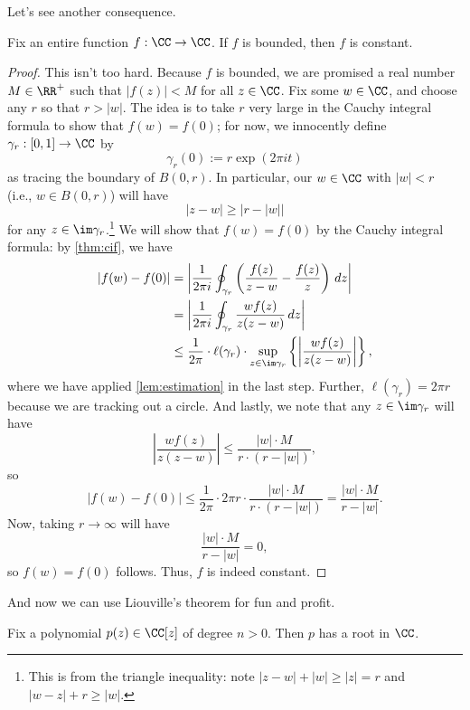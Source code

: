 Let's see another consequence.
\begin{theorem}[Liouville's] \label{thm:liouville}
	Fix an entire function $f:\CC\to\CC$. If $f$ is bounded, then $f$ is constant.
\end{theorem}
\begin{proof}
	This isn't too hard. Because $f$ is bounded, we are promised a real number $M\in\RR^+$ such that $|f(z)|<M$ for all $z\in\CC$. Fix some $w\in\CC$, and choose any $r$ so that $r>|w|$. The idea is to take $r$ very large in the Cauchy integral formula to show that $f(w)=f(0)$; for now, we innocently define $\gamma_r:[0,1]\to\CC$ by
	\[\gamma_r(0):=r\exp(2\pi it)\]
	as tracing the boundary of $B(0,r)$. In particular, our $w\in\CC$ with $|w|<r$ (i.e., $w\in B(0,r)$) will have
	\[|z-w|\ge|r-|w||\]
	for any $z\in\im\gamma_r$.\footnote{This is from the triangle inequality: note $|z-w|+|w|\ge|z|=r$ and $|w-z|+r\ge|w|$.} We will show that $f(w)=f(0)$ by the Cauchy integral formula: by \autoref{thm:cif}, we have
	\begin{align*}
		|f(w)-f(0)| &= \left|\frac1{2\pi i}\oint_{\gamma_r}\left(\frac{f(z)}{z-w}-\frac{f(z)}z\right)\,dz\right| \\
		&= \left|\frac1{2\pi i}\oint_{\gamma_r}\frac{wf(z)}{z(z-w)}\,dz\right| \\
		&\le \frac1{2\pi}\cdot\ell(\gamma_r)\cdot\sup_{z\in\im\gamma_r}\left\{\left|\frac{wf(z)}{z(z-w)}\right|\right\},
	\end{align*}
	where we have applied \autoref{lem:estimation} in the last step. Further, $\ell(\gamma_r)=2\pi r$ because we are tracking out a circle. And lastly, we note that any $z\in\im\gamma_r$ will have
	\[\left|\frac{wf(z)}{z(z-w)}\right|\le\frac{|w|\cdot M}{r\cdot(r-|w|)},\]
	so
	\[|f(w)-f(0)|\le\frac1{2\pi}\cdot2\pi r\cdot\frac{|w|\cdot M}{r\cdot(r-|w|)}=\frac{|w|\cdot M}{r-|w|}.\]
	Now, taking $r\to\infty$ will have
	\[\frac{|w|\cdot M}{r-|w|}=0,\]
	so $f(w)=f(0)$ follows. Thus, $f$ is indeed constant.
\end{proof}
And now we can use Liouville's theorem for fun and profit.
\begin{theorem}
	Fix a polynomial $p(z)\in\CC[z]$ of degree $n>0$. Then $p$ has a root in $\CC$.
\end{theorem}
